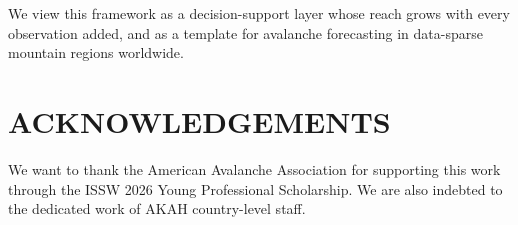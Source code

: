 \documentclass{issw}
\begin{document}
We view this framework as a decision-support layer whose reach grows with every observation added, and as a template for avalanche forecasting in data-sparse mountain regions worldwide.


{}
\section*{ACKNOWLEDGEMENTS}
We want to thank the American Avalanche Association for supporting this work through the ISSW 2026 Young Professional Scholarship. We are also indebted to the dedicated work of AKAH country-level staff.

\printbibliography[title={REFERENCES}]
\end{document}
